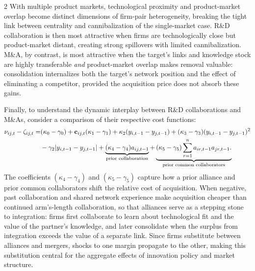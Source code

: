 \documentclass[12pt]{article}
\begin{document}
\begin{spacing}{2}
With multiple product markets, technological proximity and product-market
overlap become distinct dimensions of firm-pair heterogeneity, breaking the
tight link between centrality and cannibalization of the single-market case.
R\&D collaboration is then most attractive when firms are technologically close
but product-market distant, creating strong spillovers with limited
cannibalization. M\&A, by contrast, is most attractive when the target's links
and knowledge stock are highly transferable \emph{and} product-market overlap
makes removal valuable: consolidation internalizes both the target's network
position and the effect of eliminating a competitor, provided the acquisition
price does not absorb these gains.

Finally, to understand the dynamic interplay between R\&D collaborations and M\&As, consider a comparison of their respective cost functions:
\begin{align}
\nu_{ij,t}-\zeta_{ij,t} = & (\kappa_0-\gamma_0)
+
\mathbf{c}_{ij,t}(\kappa_1-\gamma_1)
+
\kappa_2(y_{i,t-1}-y_{j,t-1})
+
(\kappa_3-\gamma_3)(y_{i,t-1}-y_{j,t-1})^2
\notag\\
\qquad
& -
\gamma_2 |y_{i,t-1}-y_{j,t-1}|
+
\underbrace{(\kappa_4-\gamma_4)a_{ij,t-1}}_{
\text{prior collaboration}
}
+
\underbrace{(\kappa_5-\gamma_5)\sum_{r=1}^n a_{ir,t-1}a_{jr,t-1}.}_{
\text{prior common collaborators}
}
\label{eq:mna_rnd_cost-diff}
\end{align}
The coefficients $(\kappa_4-\gamma_4)$ and $(\kappa_5-\gamma_5)$ capture how a
prior alliance and prior common collaborators shift the relative cost of
acquisition. When negative, past collaboration and shared network experience
make acquisition cheaper than continued arm's-length collaboration, so that
alliances serve as a stepping stone to integration: firms first collaborate to
learn about technological fit and the value of the partner's knowledge, and
later consolidate when the surplus from integration exceeds the value of a
separate link. 
Since firms substitute between alliances and
mergers, shocks to one margin propagate to the other, making this substitution
central for the aggregate effects of innovation policy and market structure.


\end{spacing}
\end{document}
